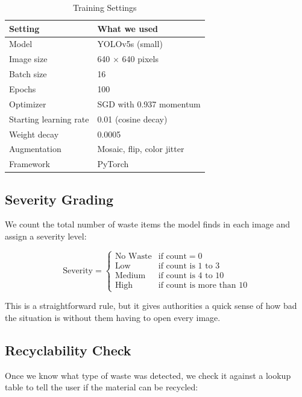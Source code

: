 \documentclass[conference]{IEEEtran}
\begin{document}
\begin{table}[H]
\centering
\caption{Training Settings}
\label{tab:training}
\begin{tabular}{@{}ll@{}}
\toprule
\textbf{Setting} & \textbf{What we used} \\
\midrule
Model & YOLOv5s (small) \\
Image size & 640 $\times$ 640 pixels \\
Batch size & 16 \\
Epochs & 100 \\
Optimizer & SGD with 0.937 momentum \\
Starting learning rate & 0.01 (cosine decay) \\
Weight decay & 0.0005 \\
Augmentation & Mosaic, flip, color jitter \\
Framework & PyTorch \\
\bottomrule
\end{tabular}
\end{table}

\subsection{Severity Grading}
We count the total number of waste items the model finds in each image and assign a severity level:

\begin{equation}
    \text{Severity} = \begin{cases}
        \text{No Waste} & \text{if count} = 0 \\
        \text{Low} & \text{if count is 1 to 3} \\
        \text{Medium} & \text{if count is 4 to 10} \\
        \text{High} & \text{if count is more than 10}
    \end{cases}
\end{equation}

This is a straightforward rule, but it gives authorities a quick sense of how bad the situation is without them having to open every image.

\subsection{Recyclability Check}
Once we know what type of waste was detected, we check it against a lookup table to tell the user if the material can be recycled:
\end{document}
